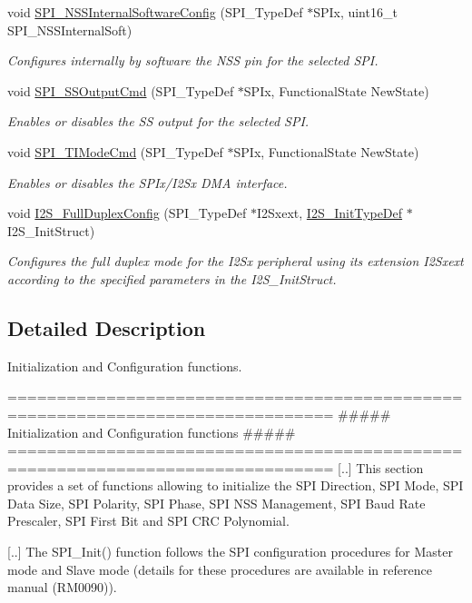 \begin{DoxyCompactItemize}
void \mbox{\hyperlink{group___s_p_i___group1_ga56fc508a482f032f9eb80e4c63184126}{S\+P\+I\+\_\+\+N\+S\+S\+Internal\+Software\+Config}} (S\+P\+I\+\_\+\+Type\+Def $\ast$S\+P\+Ix, uint16\+\_\+t S\+P\+I\+\_\+\+N\+S\+S\+Internal\+Soft)
\begin{DoxyCompactList}\small\item\em Configures internally by software the N\+SS pin for the selected S\+PI. \end{DoxyCompactList}\item 
void \mbox{\hyperlink{group___s_p_i___group1_ga4ec54abdedf6cd17403d853a926d91c1}{S\+P\+I\+\_\+\+S\+S\+Output\+Cmd}} (S\+P\+I\+\_\+\+Type\+Def $\ast$S\+P\+Ix, Functional\+State New\+State)
\begin{DoxyCompactList}\small\item\em Enables or disables the SS output for the selected S\+PI. \end{DoxyCompactList}\item 
void \mbox{\hyperlink{group___s_p_i___group1_ga74594bf32e3bf4905ac7a2deef8eb475}{S\+P\+I\+\_\+\+T\+I\+Mode\+Cmd}} (S\+P\+I\+\_\+\+Type\+Def $\ast$S\+P\+Ix, Functional\+State New\+State)
\begin{DoxyCompactList}\small\item\em Enables or disables the S\+P\+Ix/\+I2\+Sx D\+MA interface. \end{DoxyCompactList}\item 
void \mbox{\hyperlink{group___s_p_i___group1_ga60082947bedfe9efc233405be2a7bec2}{I2\+S\+\_\+\+Full\+Duplex\+Config}} (S\+P\+I\+\_\+\+Type\+Def $\ast$I2\+Sxext, \mbox{\hyperlink{struct_i2_s___init_type_def}{I2\+S\+\_\+\+Init\+Type\+Def}} $\ast$I2\+S\+\_\+\+Init\+Struct)
\begin{DoxyCompactList}\small\item\em Configures the full duplex mode for the I2\+Sx peripheral using its extension I2\+Sxext according to the specified parameters in the I2\+S\+\_\+\+Init\+Struct. \end{DoxyCompactList}\end{DoxyCompactItemize}


\subsection{Detailed Description}
Initialization and Configuration functions. 

\begin{DoxyVerb} ===============================================================================
             ##### Initialization and Configuration functions ##### 
 ===============================================================================  
 [..] This section provides a set of functions allowing to initialize the SPI 
      Direction, SPI Mode, SPI Data Size, SPI Polarity, SPI Phase, SPI NSS 
      Management, SPI Baud Rate Prescaler, SPI First Bit and SPI CRC Polynomial.
  
 [..] The SPI_Init() function follows the SPI configuration procedures for Master 
      mode and Slave mode (details for these procedures are available in reference 
      manual (RM0090)).\end{DoxyVerb}
 

